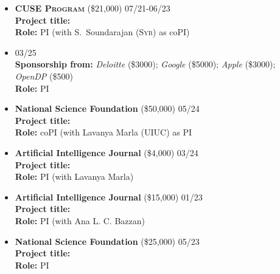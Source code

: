 \begin{itemize}
	\item
	\textbf{\textsc{CUSE Program}}
	(\$21,000)
	\hfill\textsc{07/21-06/23}\\
	{\bf Project title:} \\
	{\bf Role:} PI (with S.~Soundarajan (\textsc{Syr}) as coPI)	
\end{itemize}


\medskip
\begin{itemize}
	\item {} \hfill\textsc{03/25}\\
	{\bf Sponsorship from:} 
	\textit{Deloitte} {(\$3000)};
	\textit{Google} {(\$5000)}; 
	\textit{Apple} {(\$3000)};
	\textit{OpenDP} {(\$500)}\\
	{\bf Role:} PI

	\item
	\textbf{National Science Foundation}
	{(\$50,000)} \hfill\textsc{05/24}\\
	{\bf Project title:} \\
	{\bf Role:} coPI (with Lavanya Marla (\textsc{UIUC}) as PI

	\item
	\textbf{Artificial Intelligence Journal}
	{(\$4,000)} \hfill\textsc{03/24}\\
	{\bf Project title:} \\
	{\bf Role:} PI {(with Lavanya Marla)}
	
	\item
	\textbf{Artificial Intelligence Journal}
	({\$15,000}) \hfill\textsc{01/23}\\
	{\bf Project title:} \\
	{\bf Role: } PI (with Ana L. C. Bazzan)

	\item
	\textbf{National Science Foundation}
	{(\$25,000)}
	\hfill\textsc{05/23}\\
	{\bf Project title:} \\
	{\bf Role:} PI


\end{itemize}
